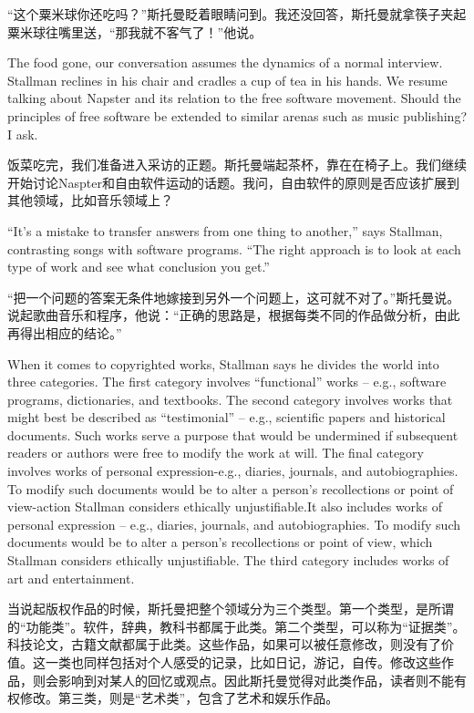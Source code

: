 \ifdefined\chs
``这个粟米球你还吃吗？''斯托曼眨着眼睛问到。我还没回答，斯托曼就拿筷子夹起粟米球往嘴里送，``那我就不客气了！''他说。
\fi

\ifdefined\eng
The food gone, our conversation assumes the dynamics of a normal interview. Stallman reclines in his chair and cradles a cup of tea in his hands. We resume talking about Napster and its relation to the free software movement. Should the principles of free software be extended to similar arenas such as music publishing? I ask.
\fi

\ifdefined\chs
饭菜吃完，我们准备进入采访的正题。斯托曼端起茶杯，靠在在椅子上。我们继续开始讨论Naspter和自由软件运动的话题。我问，自由软件的原则是否应该扩展到其他领域，比如音乐领域上？
\fi

\ifdefined\eng
``It's a mistake to transfer answers from one thing to another,'' says Stallman, contrasting songs with software programs. ``The right approach is to look at each type of work and see what conclusion you get.''
\fi

\ifdefined\chs
``把一个问题的答案无条件地嫁接到另外一个问题上，这可就不对了。''斯托曼说。说起歌曲音乐和程序，他说：``正确的思路是，根据每类不同的作品做分析，由此再得出相应的结论。''
\fi

\ifdefined\eng
When it comes to copyrighted works, Stallman says he divides the world into three categories. The first category involves ``functional'' works -- e.g., software programs, dictionaries, and textbooks. The second category involves works that might best be described as ``testimonial'' -- e.g., scientific papers and historical documents. Such works serve a purpose that would be undermined if subsequent readers or authors were free to modify the work at will.  \ifdefined\vone The final category involves works of personal expression-e.g., diaries, journals, and autobiographies. To modify such documents would be to alter a person's recollections or point of view-action Stallman considers ethically unjustifiable.\fi\ifdefined\vtwo It also includes works of personal expression -- e.g., diaries, journals, and autobiographies. To modify such documents would be to alter a person's recollections or point of view, which Stallman considers ethically unjustifiable.  The third category includes works of art and entertainment.\fi
\fi

\ifdefined\chs
当说起版权作品的时候，斯托曼把整个领域分为三个类型。第一个类型，是所谓的``功能类''。软件，辞典，教科书都属于此类。第二个类型，可以称为``证据类''。科技论文，古籍文献都属于此类。这些作品，如果可以被任意修改，则没有了价值。这一类也同样包括对个人感受的记录，比如日记，游记，自传。修改这些作品，则会影响到对某人的回忆或观点。因此斯托曼觉得对此类作品，读者则不能有权修改。第三类，则是``艺术类''，包含了艺术和娱乐作品。
\fi

